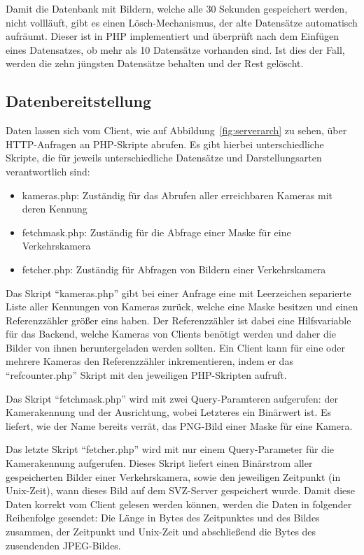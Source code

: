 Damit die Datenbank mit Bildern, welche alle 30 Sekunden gespeichert werden, nicht vollläuft, gibt es einen Lösch-Mechanismus, der alte Datensätze automatisch aufräumt. 
Dieser ist in PHP implementiert und überprüft nach dem Einfügen eines Datensatzes, ob mehr als 10 Datensätze vorhanden sind.
Ist dies der Fall, werden die zehn jüngsten Datensätze behalten und der Rest gelöscht.
\newpage

\subsection{Datenbereitstellung}
Daten lassen sich vom Client, wie auf Abbildung~\ref{fig:serverarch} zu sehen, über HTTP-Anfragen an PHP-Skripte abrufen. Es gibt hierbei unterschiedliche Skripte, die für jeweils unterschiedliche Datensätze und Darstellungsarten verantwortlich sind:
\begin{itemize}
\item{kameras.php: Zuständig für das Abrufen aller erreichbaren Kameras mit deren Kennung}
\item{fetchmask.php: Zuständig für die Abfrage einer Maske für eine Verkehrskamera}
\item{fetcher.php: Zuständig für Abfragen von Bildern einer Verkehrskamera}
\end{itemize}
Das Skript "`kameras.php"' gibt bei einer Anfrage eine mit Leerzeichen separierte Liste aller Kennungen von Kameras zurück, welche eine Maske besitzen und einen Referenzzähler größer eins haben.
Der Referenzzähler ist dabei eine Hilfsvariable für das Backend, welche Kameras von Clients benötigt werden und daher die Bilder von ihnen heruntergeladen werden sollten.
Ein Client kann für eine oder mehrere Kameras den Referenzzähler inkrementieren, indem er das "`refcounter.php"' Skript mit den jeweiligen PHP-Skripten aufruft.

Das Skript "`fetchmask.php"' wird mit zwei Query-Paramteren aufgerufen: der Kamerakennung und der Ausrichtung, wobei Letzteres ein Binärwert ist. 
Es liefert, wie der Name bereits verrät, das PNG-Bild einer Maske für eine Kamera.

Das letzte Skript "`fetcher.php"' wird mit nur einem Query-Parameter für die Kamerakennung aufgerufen. 
Dieses Skript liefert einen Binärstrom aller gespeicherten Bilder einer Verkehrskamera, sowie den jeweiligen Zeitpunkt (in Unix-Zeit), wann dieses Bild auf dem SVZ-Server gespeichert wurde. 
Damit diese Daten korrekt vom Client gelesen werden können, werden die Daten in folgender Reihenfolge gesendet: Die Länge in Bytes des Zeitpunktes und des Bildes zusammen, der Zeitpunkt und Unix-Zeit und abschließend die Bytes des zusendenden JPEG-Bildes.
\newpage

